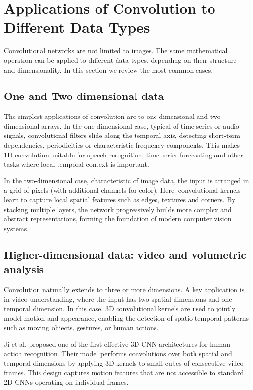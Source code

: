\chapter{Applications of Convolution to Different Data Types}

Convolutional networks are not limited to images.  
The same mathematical operation can be applied to different data types, depending on their structure and dimensionality. In this section we review the most common cases.  

\section{One and Two dimensional data}

The simplest applications of convolution are to one-dimensional and two-dimensional arrays.  
In the one-dimensional case, typical of time series or audio signals, convolutional filters slide along the temporal axis, detecting short-term dependencies, periodicities or characteristic frequency components.  
This makes 1D convolution suitable for speech recognition, time-series forecasting and other tasks where local temporal context is important.  

In the two-dimensional case, characteristic of image data, the input is arranged in a grid of pixels (with additional channels for color).  
Here, convolutional kernels learn to capture local spatial features such as edges, textures and corners.  
By stacking multiple layers, the network progressively builds more complex and abstract representations, forming the foundation of modern computer vision systems.  

\section{Higher-dimensional data: video and volumetric analysis}
\label{sec:3D-CNNs}%

Convolution naturally extends to three or more dimensions.  
A key application is in video understanding, where the input has two spatial dimensions and one temporal dimension.  
In this case, 3D convolutional kernels are used to jointly model motion and appearance, enabling the detection of spatio-temporal patterns such as moving objects, gestures, or human actions.  

\clearpage

Ji et al. \cite{ji2013} proposed one of the first effective 3D CNN architectures for human action recognition.  
Their model performs convolutions over both spatial and temporal dimensions by applying 3D kernels to small cubes of consecutive video frames.  
This design captures motion features that are not accessible to standard 2D CNNs operating on individual frames.

